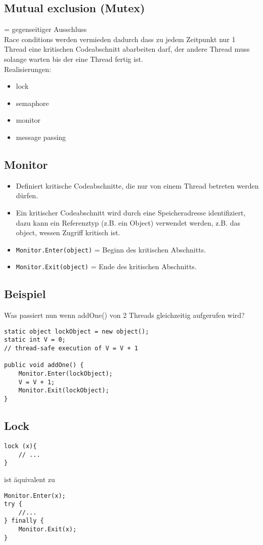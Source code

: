 \subsection{Mutual exclusion (Mutex)}
= gegenseitiger Ausschluss\\
Race conditions werden vermieden dadurch dass zu jedem Zeitpunkt nur 1 Thread eine kritischen Codeabschnitt abarbeiten darf, der andere Thread muss solange warten bis der eine Thread fertig ist.\\
Realisierungen:
\begin{itemize}
\item lock
\item semaphore
\item monitor
\item message passing
\end{itemize}

\subsection{Monitor}
\begin{itemize}
\item Definiert kritische Codeabschnitte, die nur von einem Thread betreten werden dürfen. 
\item Ein kritischer Codeabschnitt wird durch eine Speicheradresse identifiziert, dazu kann ein Referenztyp (z.B. ein Object) verwendet werden, z.B. das object, wessen Zugriff kritisch ist.
\item \lstinline$Monitor.Enter(object)$ = Beginn des kritischen Abschnitts.
\item \lstinline$Monitor.Exit(object)$  = Ende des kritischen Abschnitts. 
\end{itemize}

\subsection{Beispiel} Was passiert nun wenn addOne() von 2 Threads gleichzeitig aufgerufen wird? 
\begin{lstlisting}[language={[Sharp]C}]
static object lockObject = new object(); 
static int V = 0; 
// thread-safe execution of V = V + 1 

public void addOne() { 
	Monitor.Enter(lockObject); 
	V = V + 1; 
	Monitor.Exit(lockObject); 
}
\end{lstlisting}

\subsection{Lock}
\begin{lstlisting}[language={[Sharp]C}]
lock (x){
	// ...
}
\end{lstlisting}
ist äquivalent zu 
\begin{lstlisting}[language={[Sharp]C}]
Monitor.Enter(x);
try {
	//...
} finally {
	Monitor.Exit(x);
}
\end{lstlisting}